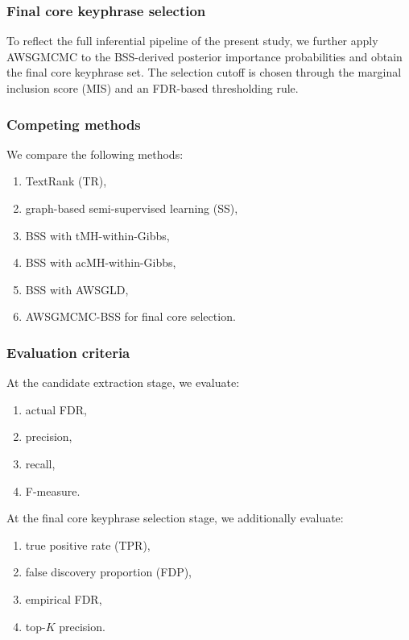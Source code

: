 \documentclass[11pt]{article}
\begin{document}
\subsubsection{Final core keyphrase selection}

To reflect the full inferential pipeline of the present study, we further apply AWSGMCMC to the BSS-derived posterior importance probabilities and obtain the final core keyphrase set. The selection cutoff is chosen through the marginal inclusion score (MIS) and an FDR-based thresholding rule.

\subsubsection{Competing methods}

We compare the following methods:
\begin{enumerate}
    \item TextRank (TR),
    \item graph-based semi-supervised learning (SS),
    \item BSS with tMH-within-Gibbs,
    \item BSS with acMH-within-Gibbs,
    \item BSS with AWSGLD,
    \item AWSGMCMC-BSS for final core selection.
\end{enumerate}

\subsubsection{Evaluation criteria}

At the candidate extraction stage, we evaluate:
\begin{enumerate}
    \item actual FDR,
    \item precision,
    \item recall,
    \item F-measure.
\end{enumerate}
At the final core keyphrase selection stage, we additionally evaluate:
\begin{enumerate}
    \item true positive rate (TPR),
    \item false discovery proportion (FDP),
    \item empirical FDR,
    \item top-$K$ precision.
\end{enumerate}
\end{document}
